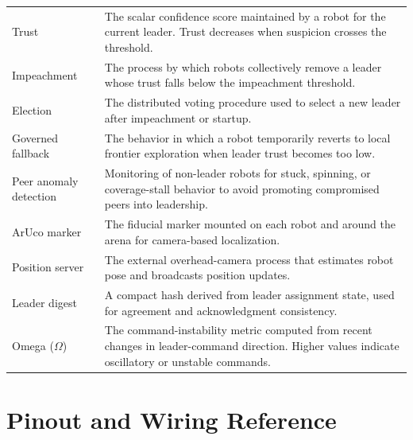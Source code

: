 \documentclass[a4paper,oneside,titlepage,11pt]{report}
\begin{document}
\begin{longtable}{p{} p{}}
Trust & The scalar confidence score maintained by a robot for the current leader. Trust decreases when suspicion crosses the threshold. \\

Impeachment & The process by which robots collectively remove a leader whose trust falls below the impeachment threshold. \\

Election & The distributed voting procedure used to select a new leader after impeachment or startup. \\

Governed fallback & The behavior in which a robot temporarily reverts to local frontier exploration when leader trust becomes too low. \\

Peer anomaly detection & Monitoring of non-leader robots for stuck, spinning, or coverage-stall behavior to avoid promoting compromised peers into leadership. \\

ArUco marker & The fiducial marker mounted on each robot and around the arena for camera-based localization. \\

Position server & The external overhead-camera process that estimates robot pose and broadcasts position updates. \\

Leader digest & A compact hash derived from leader assignment state, used for agreement and acknowledgment consistency. \\

Omega ($\Omega$) & The command-instability metric computed from recent changes in leader-command direction. Higher values indicate oscillatory or unstable commands. \\

\bottomrule
\end{longtable}


\chapter{Pinout and Wiring Reference}
\label{app:wiring}
\end{document}
